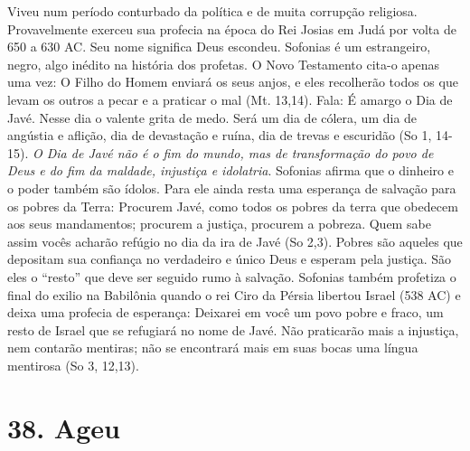 \documentclass[
]{book}
\begin{document}
Viveu num período conturbado da política e de muita corrupção religiosa. Provavelmente exerceu sua profecia na época do Rei Josias em Judá por volta de 650 a 630 AC. Seu nome significa Deus escondeu. Sofonias é um estrangeiro, negro, algo inédito na história dos profetas. O Novo Testamento cita-o apenas uma vez: O Filho do Homem enviará os seus anjos, e eles recolherão todos os que levam os outros a pecar e a praticar o mal (Mt. 13,14). Fala: É amargo o Dia de Javé. Nesse dia o valente grita de medo. Será um dia de cólera, um dia de angústia e aflição, dia de devastação e ruína, dia de trevas e escuridão (So 1, 14-15). \emph{O Dia de Javé não é o fim do mundo, mas de transformação do povo de Deus e do fim da maldade, injustiça e idolatria}. Sofonias afirma que o dinheiro e o poder também são ídolos. Para ele ainda resta uma esperança de salvação para os pobres da Terra: Procurem Javé, como todos os pobres da terra que obedecem aos seus mandamentos; procurem a justiça, procurem a pobreza. Quem sabe assim vocês acharão refúgio no dia da ira de Javé (So 2,3). Pobres são aqueles que depositam sua confiança no verdadeiro e único Deus e esperam pela justiça. São eles o ``resto'' que deve ser seguido rumo à salvação. Sofonias também profetiza o final do exilio na Babilônia quando o rei Ciro da Pérsia libertou Israel (538 AC) e deixa uma profecia de esperança: Deixarei em você um povo pobre e fraco, um resto de Israel que se refugiará no nome de Javé. Não praticarão mais a injustiça, nem contarão mentiras; não se encontrará mais em suas bocas uma língua mentirosa (So 3, 12,13).

\hypertarget{ageu}{%
\section*{38. Ageu}\label{ageu}}
\end{document}
